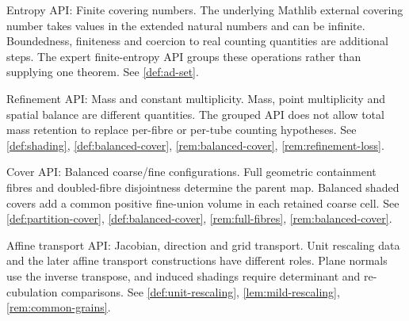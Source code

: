 \begin{remark}
\label{rem:atlas-Ientropy}
Entropy API: Finite covering numbers.
The underlying Mathlib external covering number takes values in the extended natural numbers and can be infinite. Boundedness, finiteness and coercion to real counting quantities are additional steps. The expert finite-entropy API groups these operations rather than supplying one theorem.
See \ref{def:ad-set}.
\end{remark}

\begin{remark}
\label{rem:atlas-Imass}
Refinement API: Mass and constant multiplicity.
Mass, point multiplicity and spatial balance are different quantities. The grouped API does not allow total mass retention to replace per-fibre or per-tube counting hypotheses.
See \ref{def:shading}, \ref{def:balanced-cover}, \ref{rem:balanced-cover}, \ref{rem:refinement-loss}.
\end{remark}

\begin{remark}
\label{rem:atlas-Icover}
Cover API: Balanced coarse/fine configurations.
Full geometric containment fibres and doubled-fibre disjointness determine the parent map. Balanced shaded covers add a common positive fine-union volume in each retained coarse cell.
See \ref{def:partition-cover}, \ref{def:balanced-cover}, \ref{rem:full-fibres}, \ref{rem:balanced-cover}.
\end{remark}

\begin{remark}
\label{rem:atlas-Iaffine}
Affine transport API: Jacobian, direction and grid transport.
Unit rescaling data and the later affine transport constructions have different roles. Plane normals use the inverse transpose, and induced shadings require determinant and re-cubulation comparisons.
See \ref{def:unit-rescaling}, \ref{lem:mild-rescaling}, \ref{rem:common-grains}.
\end{remark}

